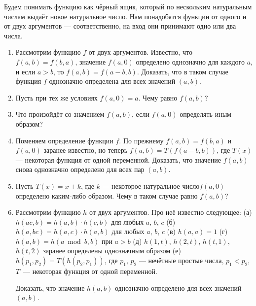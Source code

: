 
\ms Будем понимать функцию как чёрный ящик, который по нескольким натуральным числам выдаёт новое натуральное число. Нам понадобятся функции от одного и от двух аргументов --- соответственно, на вход они принимают одно или два числа.

\begin{enumerate}

\item Рассмотрим функцию $f$ от двух аргументов. Известно, что $f(a,b) = f(b,a)$, значение $f(a,0)$ определено однозначно для каждого $a$, и если $a>b$, то $f(a,b) = f(a-b,b)$. Доказать, что в таком случае функция $f$ однозначно определена для всех значений $(a,b)$.

\item Пусть при тех же условиях $f(a,0)=a$. Чему равно $f(a,b)$?

\item Что произойдёт со значением $f(a,b)$, если $f(a,0)$ определять иным образом?

\item Поменяем определение функции $f$. По прежнему $f(a,b) = f(b,a)$ и $f(a,0)$ заранее известно, но теперь $f(a,b) = T(f(a-b,b))$, где $T(x)$ --- некоторая функция от одной переменной. Доказать, что значение $f(a,b)$ снова однозначно определено для всех пар $(a,b)$.

\item Пусть $T(x) = x+k$, где $k$ --- некоторое натуральное число\scolon $f(a,0)$ определено каким-либо образом. Чему в таком случае равно $f(a,b)$?

\item Рассмотрим функцию $h$ от двух аргументов. Про неё известно следующее:
  \subitem (а) $h(ac,b) = h(a,b) \cdot h(c,b)$ для любых $a$, $b$, $c$\scolon
  \subitem (б) $h(a,bc) = h(a,c) \cdot h(a,b)$ для любых $a$, $b$, $c$\scolon
  \subitem (в) $h(a,a) = 1$\scolon
  \subitem (г) $h(a,b) = h(a \bmod b, b)$ при $a>b$\scolon
  \subitem (д) $h(1,t)$, $h(2,t)$, $h(t,1)$, $h(t,2)$ заранее определены однозначным образом\scolon
  \subitem (е) $h(p_1,p_2) = T(h(p_2,p_1))$, где $p_1$, $p_2$ --- нечётные простые числа, $p_1<p_2$, $T$~--- некоторая функция от одной переменной.

\ms Доказать, что значение $h(a,b)$ однозначно определено для всех значений $(a,b)$.

\end{enumerate}